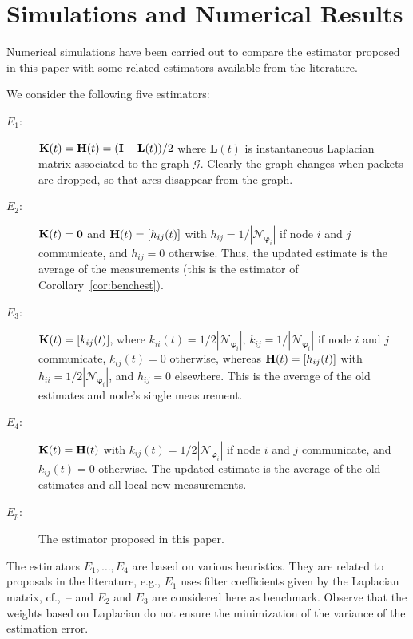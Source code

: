 \documentclass[a4paper,notitlepage,onecolumn]{article}
\def\0{\mathbf{0}}
\def\I{{\cal I}}
\def\K{{\cal K}}
\def\K{{\bf K}}
\def\H{{\bf H}}
\def\I{{\bf I}}
\def\varphib{\boldsymbol{\varphi}}
\numberwithin{equation}{section}
\begin{document}
\section{Simulations and Numerical Results} \label{sec:simulations}

Numerical simulations have been carried out to compare the
estimator proposed in this paper with some related estimators
available from the literature.

We consider the following five estimators:
\begin{description}
  \item[${E_1}$:] $\K(t)=\H(t)=(\I-\mathbf{L}(t))/2$ where $\mathbf{L}(t)$ is instantaneous Laplacian matrix
  associated to the graph $\mathcal{G}$. Clearly the graph changes when packets are dropped, so that arcs disappear from the graph.
  \item[${E_2}$:] $\K(t)=\0$ and $\H(t)=[h_{ij}(t)]$ with
      $h_{ij}=1/|\mathcal{N}_{\varphib_i}|$ if node $i$ and
      $j$ communicate, and $h_{ij}=0$ otherwise. Thus, the
      updated estimate is the  average of the measurements
      (this is the estimator of Corollary~\ref{cor:benchest}).
  \item[${E_3}$:] $\K(t)=[k_{ij}(t)]$, where $k_{ii}(t)=1/2|\mathcal{N}_{\varphib_i}|$,
$k_{ij}=1/|\mathcal{N}_{\varphib_i}|$ if node $i$ and $j$ communicate, $k_{ij}(t)=0$ otherwise, whereas $\H(t)=[h_{ij}(t)]$
  with $h_{ii}=1/2|\mathcal{N}_{\varphib_i}|$, and $h_{ij}=0$ elsewhere. This is the average of the old estimates and node's single measurement.
  \item[${E_4}$:] $\K(t)=\H(t)$ with
$k_{ij}(t)=1/2|\mathcal{N}_{\varphib_i}|$ if node $i$ and $j$
communicate, and $k_{ij}(t)=0$ otherwise. The updated estimate is the
average of the old estimates and all local new measurements.
   \item[${E_p}$:] The estimator proposed in this paper.
\end{description}
The estimators $E_1,\dots,E_4$ are based on various heuristics.
They are related to proposals in the literature, e.g., ${E_1}$
uses filter coefficients given by the Laplacian matrix,
cf.,~\cite{XiaoBoydLall}--\cite{Olfati05} and $E_2$ and $E_3$ are
considered here as benchmark. Observe that the weights based on
Laplacian do not ensure the minimization of the variance of the
estimation error.
\end{document}

